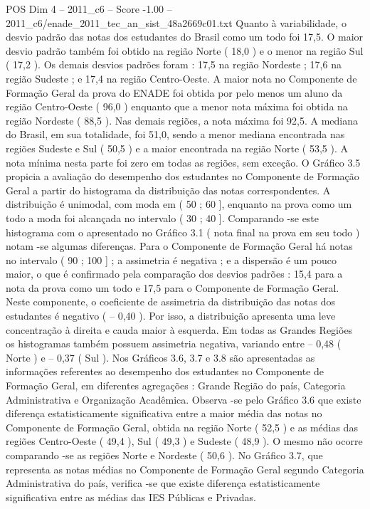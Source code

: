 \begin{textsample}{POS Dim 4 – 2011\_c6 – Score -1.00 – 2011\_c6/enade\_2011\_tec\_an\_sist\_48a2669c01.txt}
Quanto à variabilidade, o desvio padrão das notas dos estudantes do Brasil como um todo foi 17,5.
O maior desvio padrão também foi obtido na região Norte ( 18,0 ) e o menor na região Sul ( 17,2 ).
Os demais desvios padrões foram : 17,5 na região Nordeste ; 17,6 na região Sudeste ; e 17,4 na região Centro-Oeste.
A maior nota no Componente de Formação Geral da prova do ENADE foi obtida por pelo menos um aluno da região Centro-Oeste ( 96,0 ) enquanto que a menor nota máxima foi obtida na região Nordeste ( 88,5 ).
Nas demais regiões, a nota máxima foi 92,5.
A mediana do Brasil, em sua totalidade, foi 51,0, sendo a menor mediana encontrada nas regiões Sudeste e Sul ( 50,5 ) e a maior encontrada na região Norte ( 53,5 ).
A nota mínima nesta parte foi zero em todas as regiões, sem exceção.
O Gráfico 3.5 propicia a avaliação do desempenho dos estudantes no Componente de Formação Geral a partir do histograma da distribuição das notas correspondentes.
A distribuição é unimodal, com moda em ( 50 ; 60 ], enquanto na prova como um todo a moda foi alcançada no intervalo ( 30 ; 40 ].
Comparando -se este histograma com o apresentado no Gráfico 3.1 ( nota final na prova em seu todo ) notam -se algumas diferenças.
Para o Componente de Formação Geral há notas no intervalo ( 90 ; 100 ] ; a assimetria é negativa ; e a dispersão é um pouco maior, o que é confirmado pela comparação dos desvios padrões : 15,4 para a nota da prova como um todo e 17,5 para o Componente de Formação Geral.
Neste componente, o coeficiente de assimetria da distribuição das notas dos estudantes é negativo ( – 0,40 ).
Por isso, a distribuição apresenta uma leve concentração à direita e cauda maior à esquerda.
Em todas as Grandes Regiões os histogramas também possuem assimetria negativa, variando entre – 0,48 ( Norte ) e – 0,37 ( Sul ).
Nos Gráficos 3.6, 3.7 e 3.8 são apresentadas as informações referentes ao desempenho dos estudantes no Componente de Formação Geral, em diferentes agregações : Grande Região do país, Categoria Administrativa e Organização Acadêmica.
Observa -se pelo Gráfico 3.6 que existe diferença estatisticamente significativa entre a maior média das notas no Componente de Formação Geral, obtida na região Norte ( 52,5 ) e as médias das regiões Centro-Oeste ( 49,4 ), Sul ( 49,3 ) e Sudeste ( 48,9 ).
O mesmo não ocorre comparando -se as regiões Norte e Nordeste ( 50,6 ).
No Gráfico 3.7, que representa as notas médias no Componente de Formação Geral segundo Categoria Administrativa do país, verifica -se que existe diferença estatisticamente significativa entre as médias das IES Públicas e Privadas.

\end{textsample}
